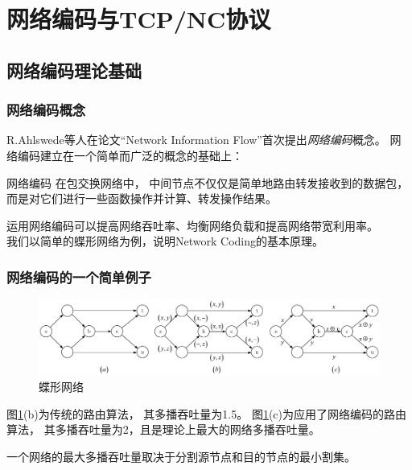 \section{网络编码与TCP/NC协议}

\subsection{网络编码理论基础}
\begin{frame}[t]
	\frametitle{网络编码概念}
	R.Ahlswede等人在论文“Network Information Flow”首次提出\emph{网络编码}概念。
	网络编码建立在一个简单而广泛的概念的基础上：
	\begin{block}{网络编码}
		\footnotesize
		在包交换网络中，
		中间节点不仅仅是简单地路由转发接收到的数据包，
		而是对它们进行一些函数操作并计算、转发操作结果。
	\end{block}
	\vspace{1em}
	运用网络编码可以提高网络吞吐率、均衡网络负载和提高网络带宽利用率。
	\\
	我们以简单的蝶形网络为例，说明Network Coding的基本原理。
\end{frame}
\begin{frame}[t]
	\frametitle{网络编码的一个简单例子}
	\vspace{-1.5em}
	\begin{figure}[t]
		\includegraphics[height=2.5cm]{../figures/butter.eps}
		\caption{蝶形网络}
		\label{fig:butter}
	\end{figure}
	\vspace{-1em}
	图\ref{fig:butter}(b)为传统的路由算法，
	其多播吞吐量为1.5。
	图\ref{fig:butter}(c)为应用了网络编码的路由算法，
	其多播吞吐量为2，且是理论上最大的网络多播吞吐量。
	\begin{mytheorem}
	一个网络的最大多播吞吐量取决于分割源节点和目的节点的最小割集\supercite{Ahlswede2000}。
	\end{mytheorem}

\end{frame}
